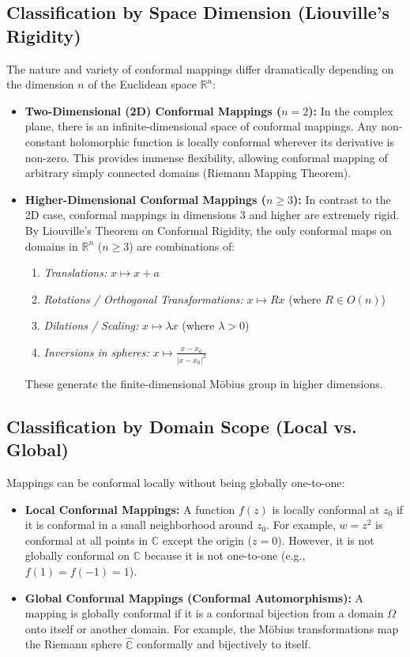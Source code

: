 \documentclass[12pt,a4paper]{article}
\begin{document}
\subsection{Classification by Space Dimension (Liouville's Rigidity)}
The nature and variety of conformal mappings differ dramatically depending on the dimension $n$ of the Euclidean space $\mathbb{R}^n$:
\begin{itemize}
    \item \textbf{Two-Dimensional (2D) Conformal Mappings ($n = 2$):} In the complex plane, there is an infinite-dimensional space of conformal mappings. Any non-constant holomorphic function is locally conformal wherever its derivative is non-zero. This provides immense flexibility, allowing conformal mapping of arbitrary simply connected domains (Riemann Mapping Theorem).
    \item \textbf{Higher-Dimensional Conformal Mappings ($n \ge 3$):} In contrast to the 2D case, conformal mappings in dimensions 3 and higher are extremely rigid. By Liouville's Theorem on Conformal Rigidity, the only conformal maps on domains in $\mathbb{R}^n$ ($n \ge 3$) are combinations of:
    \begin{enumerate}
        \item \textit{Translations:} $x \mapsto x + a$
        \item \textit{Rotations / Orthogonal Transformations:} $x \mapsto R x$ (where $R \in O(n)$)
        \item \textit{Dilations / Scaling:} $x \mapsto \lambda x$ (where $\lambda > 0$)
        \item \textit{Inversions in spheres:} $x \mapsto \frac{x - x_0}{|x - x_0|^2}$
    \end{enumerate}
    These generate the finite-dimensional M\"obius group in higher dimensions.
\end{itemize}

\subsection{Classification by Domain Scope (Local vs. Global)}
Mappings can be conformal locally without being globally one-to-one:
\begin{itemize}
    \item \textbf{Local Conformal Mappings:} A function $f(z)$ is locally conformal at $z_0$ if it is conformal in a small neighborhood around $z_0$. For example, $w = z^2$ is conformal at all points in $\mathbb{C}$ except the origin ($z = 0$). However, it is not globally conformal on $\mathbb{C}$ because it is not one-to-one (e.g., $f(1) = f(-1) = 1$).
    \item \textbf{Global Conformal Mappings (Conformal Automorphisms):} A mapping is globally conformal if it is a conformal bijection from a domain $\Omega$ onto itself or another domain. For example, the M\"obius transformations map the Riemann sphere $\hat{\mathbb{C}}$ conformally and bijectively to itself.
\end{itemize}
\end{document}
